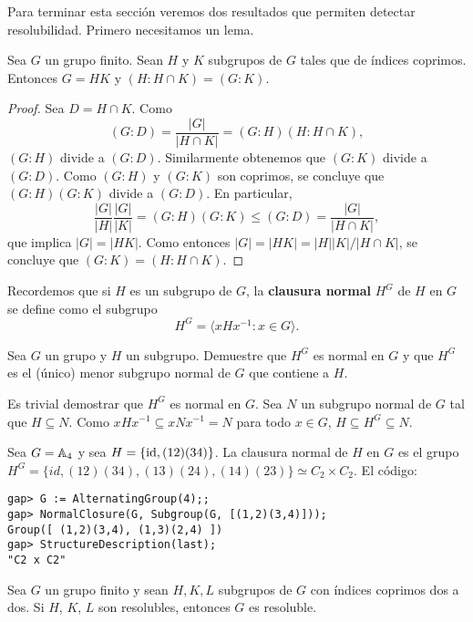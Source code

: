 Para terminar esta sección veremos dos resultados que permiten detectar
resolubilidad. Primero necesitamos un lema.

\begin{lemma}
	\label{lemma:4Wielandt}
	Sea $G$ un grupo finito. Sean $H$ y $K$ subgrupos de $G$ tales que de
	índices coprimos. Entonces $G=HK$ y $(H:H\cap K)=(G:K)$.
\end{lemma}

\begin{proof}
	Sea $D=H\cap K$. Como
	\[
	(G:D)=\frac{|G|}{|H\cap K|}=(G:H)(H:H\cap K),
	\]
	$(G:H)$ divide a $(G:D)$. Similarmente obtenemos que $(G:K)$ divide a
	$(G:D)$. Como $(G:H)$ y $(G:K)$ son coprimos, se concluye que $(G:H)(G:K)$
	divide a $(G:D)$. En particular, 
	\[
	\frac{|G|}{|H|}\frac{|G|}{|K|}=(G:H)(G:K)\leq (G:D)=\frac{|G|}{|H\cap K|},
	\]
	que implica $|G|=|HK|$. Como entonces $|G|=|HK|=|H||K|/|H\cap K|$, se
	concluye que $(G:K)=(H:H\cap K)$.
\end{proof}

Recordemos que si $H$ es un subgrupo de $G$, la
\textbf{clausura normal} $H^G$ de $H$ en $G$ se define como el subgrupo
\[
	H^G=\langle xHx^{-1}:x\in G\rangle.
\]

\begin{exercise}
	Sea $G$ un grupo y $H$ un subgrupo.  Demuestre que $H^G$ es normal en $G$ y
	que $H^G$ es el (único) menor subgrupo normal de $G$ que contiene a $H$.
\end{exercise}

\begin{svgraybox}
	Es trivial demostrar que $H^G$ es normal en $G$.  Sea $N$ un subgrupo
	normal de $G$ tal que $H\subseteq N$. Como $xHx^{-1}\subseteq xNx^{-1}=N$
	para todo $x\in G$, $H\subseteq H^G\subseteq N$. 
\end{svgraybox}

\begin{example}
	Sea $G=\mathbb{A}_4$ y sea $H=\{\operatorname{id},(12)(34)\}$. La clausura normal de $H$ en $G$
	es el grupo $H^G=\{id,(12)(34),(13)(24),(14)(23)\}\simeq C_2\times C_2$. El
	código:
	\begin{lstlisting}
gap> G := AlternatingGroup(4);;
gap> NormalClosure(G, Subgroup(G, [(1,2)(3,4)]));
Group([ (1,2)(3,4), (1,3)(2,4) ])
gap> StructureDescription(last);
"C2 x C2"
	\end{lstlisting}
\end{example}

\begin{theorem}[Wielandt]
	\label{theorem:Wielandt:solvable}
	Sea $G$ un grupo finito y sean $H,K,L$ subgrupos de $G$ con índices
	coprimos dos a dos. Si $H$, $K$, $L$ son resolubles, entonces $G$ es
	resoluble.
\end{theorem}

